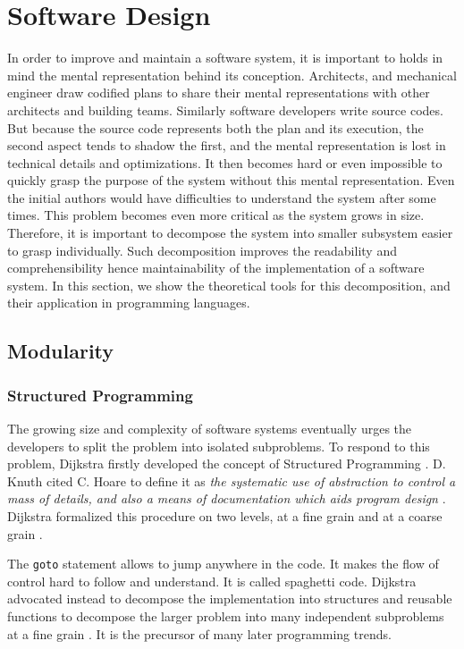\section{Software Design} \label{chapter3:software-design}

In order to improve and maintain a software system, it is important to holds in mind the mental representation behind its conception.
Architects, and mechanical engineer draw codified plans to share their mental representations with other architects and building teams.
Similarly software developers write source codes.
But because the source code represents both the plan and its execution, the second aspect tends to shadow the first, and the mental representation is lost in technical details and optimizations.
It then becomes hard or even impossible to quickly grasp the purpose of the system without this mental representation.
Even the initial authors would have difficulties to understand the system after some times.
This problem becomes even more critical as the system grows in size.
Therefore, it is important to decompose the system into smaller subsystem easier to grasp individually.
Such decomposition improves the readability and comprehensibility hence maintainability of the implementation of a software system.
In this section, we show the theoretical tools for this decomposition, and their application in programming languages.

\subsection{Modularity}

\subsubsection{Structured Programming}


The growing size and complexity of software systems eventually urges the developers to split the problem into isolated subproblems.
To respond to this problem, Dijkstra firstly developed the concept of Structured Programming \cite{Dijkstra1970}.
D. Knuth cited C. Hoare to define it as \textit{the systematic use of abstraction to control a mass of details, and also a means of documentation which aids program design} \cite{Knuth1974}.
Dijkstra formalized this procedure on two levels, at a fine grain and at a coarse grain \cite{Dijkstra1968a,Dijkstra1968}.

The \texttt{goto} statement allows to jump anywhere in the code.
It makes the flow of control hard to follow and understand.
It is called spaghetti code.
Dijkstra advocated instead to decompose the implementation into structures and reusable functions to decompose the larger problem into many independent subproblems at a fine grain \cite{Dijkstra1968a}.
It is the precursor of many later programming trends.

